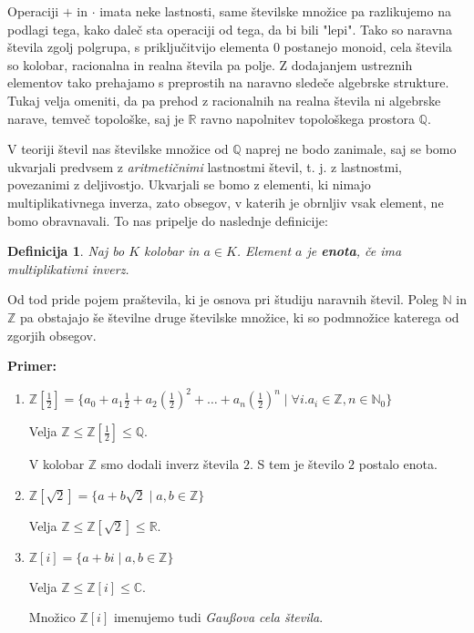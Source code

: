 \documentclass[12pt, a4paper]{article}
\newtheorem{defi}{Definicija}
\newenvironment{prim}[1][]{\par\medskip\noindent \textbf{Primer: }}{\medskip}
\begin{document}
Operaciji $+$ in $\cdot$ imata neke lastnosti, same številske množice pa razlikujemo na podlagi tega, kako daleč sta operaciji od tega, da bi bili "lepi". Tako so naravna števila zgolj polgrupa, s priključitvijo elementa $0$ postanejo monoid, cela števila so kolobar, racionalna in realna števila pa polje. Z dodajanjem ustreznih elementov tako prehajamo s preprostih na naravno sledeče algebrske strukture. Tukaj velja omeniti, da pa prehod z racionalnih na realna števila ni algebrske narave, temveč topološke, saj je $\mathbb{R}$ ravno napolnitev topološkega prostora $\mathbb{Q}$.

V teoriji števil nas številske množice od $\mathbb{Q}$ naprej ne bodo zanimale, saj se bomo ukvarjali predvsem z \textit{aritmetičnimi} lastnostmi števil, t. j. z lastnostmi, povezanimi z deljivostjo. Ukvarjali se bomo z elementi, ki nimajo multiplikativnega inverza, zato obsegov, v katerih je obrnljiv vsak element, ne bomo obravnavali. To nas pripelje do naslednje definicije:

\begin{defi}
Naj bo $K$ kolobar in $a \in K$. Element $a$ je \textbf{enota}, če ima multiplikativni inverz.
\end{defi}

Od tod pride pojem praštevila, ki je osnova pri študiju naravnih števil. Poleg $\mathbb{N}$ in $\mathbb{Z}$ pa obstajajo še številne druge številske množice, ki so podmnožice katerega od zgorjih obsegov.

\begin{prim}
\begin{enumerate}
\item $\mathbb{Z}[\frac{1}{2}] = \{a_{0} + a_{1}\frac{1}{2} + a_{2}(\frac{1}{2})^{2} + \dots +  a_{n}(\frac{1}{2})^{n} \mid \forall i. a_{i}\in \mathbb{Z}, n \in \mathbb{N}_{0} \}$

Velja $\mathbb{Z} \leq \mathbb{Z}[\frac{1}{2}] \leq \mathbb{Q}$.

V kolobar $\mathbb{Z}$ smo dodali inverz števila $2$. S tem je število $2$ postalo enota.

\item $\mathbb{Z}[\sqrt{2}] = \{a + b\sqrt{2}  \mid  a, b\in \mathbb{Z}\}$

Velja $\mathbb{Z} \leq \mathbb{Z}[\sqrt{2}] \leq \mathbb{R}$.

\item $\mathbb{Z}[i] = \{a + bi  \mid  a, b\in \mathbb{Z}\}$

Velja $\mathbb{Z} \leq \mathbb{Z}[i] \leq \mathbb{C}$.

Množico $\mathbb{Z}[i]$ imenujemo tudi \textit{Gau{\ss}ova cela števila}.

\end{enumerate}
\end{prim}
\end{document}

